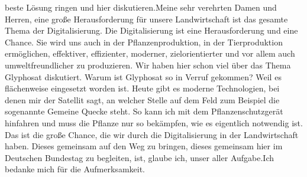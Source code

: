 \documentclass{article}
\begin{document}
beste Lösung ringen und hier diskutieren.Meine sehr verehrten Damen und Herren, eine große Herausforderung für unsere Landwirtschaft ist das gesamte Thema der Digitalisierung. Die Digitalisierung ist eine Herausforderung und eine Chance. Sie wird uns auch in der Pflanzenproduktion, in der Tierproduktion ermöglichen, effektiver, effizienter, moderner, ziel­orientierter und vor allem auch umweltfreundlicher zu produzieren. Wir haben hier schon viel über das Thema Glyphosat diskutiert. Warum ist Glyphosat so in Verruf gekommen? Weil es flächenweise eingesetzt worden ist. Heute gibt es moderne Technologien, bei denen mir der Satellit sagt, an welcher Stelle auf dem Feld zum Beispiel die sogenannte Gemeine Quecke steht. So kann ich mit dem Pflanzenschutzgerät hinfahren und muss die Pflanze nur so bekämpfen, wie es eigentlich notwendig ist. Das ist die große Chance, die wir durch die Digitalisierung in der Landwirtschaft haben. Dieses gemeinsam auf den Weg zu bringen, dieses gemeinsam hier im Deutschen Bundestag zu begleiten, ist, glaube ich, unser aller Aufgabe.Ich bedanke mich für die Aufmerksamkeit.
\end{document}
